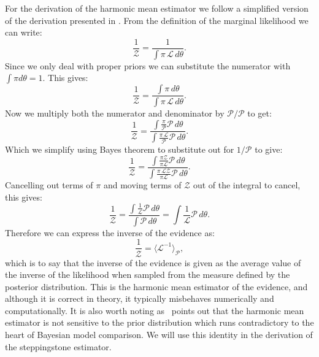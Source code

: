 For the derivation of the harmonic mean estimator we follow a simplified version of the derivation presented in \citep{newton1994approximate}. From the definition of the marginal likelihood we can write:
\begin{equation}
    \frac{1}{\mathcal{Z}} = \frac{1}{\int \pi \, \mathcal{L} \, d\theta}.
\end{equation}
Since we only deal with proper priors we can substitute the numerator with $\int \pi d\theta = 1$. This gives:
\begin{equation}
    \frac{1}{\mathcal{Z}} = \frac{\int \pi \, d\theta}{\int \pi \, \mathcal{L} \, d\theta}.
\end{equation}
Now we multiply both the numerator and denominator by $\mathcal{P}/\mathcal{P}$ to get:
\begin{equation}
    \frac{1}{\mathcal{Z}} = \frac{\int \frac{\pi}{\mathcal{P}} \mathcal{P} \, d\theta}{\int \frac{\pi \, \mathcal{L}}{\mathcal{P}}\mathcal{P} \, d\theta}.
\end{equation}
Which we simplify using Bayes theorem to substitute out for $1/\mathcal{P}$ to give:
\begin{equation}
    \frac{1}{\mathcal{Z}} = \frac{\int \frac{\pi \mathcal{Z}}{\pi \mathcal{L}} \mathcal{P} \, d\theta}{\int \frac{\pi \, \mathcal{L} \mathcal{Z}}{\pi \mathcal{L}}\mathcal{P} \, d\theta}.
\end{equation}
Cancelling out terms of $\pi$ and moving terms of $\mathcal{Z}$ out of the integral to cancel, this gives:
\begin{equation}\label{eqn:HME}
    \frac{1}{\mathcal{Z}} = \frac{\int \frac{1}{\mathcal{L}} \mathcal{P} \, d\theta}{\int \mathcal{P} \, d\theta} = \int \frac{1}{\mathcal{L}} \mathcal{P} \, d\theta.
\end{equation}
Therefore we can express the inverse of the evidence as:
\begin{equation}
    \frac{1}{\mathcal{Z}} = \langle \mathcal{L}^{-1} \rangle_{\mathcal{P}},
\end{equation}
which is to say that the inverse of the evidence is given as the average value of the inverse of the likelihood when sampled from the measure defined by the posterior distribution. This is the harmonic mean estimator of the evidence, and although it is correct in theory, it typically misbehaves numerically and computationally. It is also worth noting as~\cite{xie2010improving} points out that the harmonic mean estimator is not sensitive to the prior distribution which runs contradictory to the heart of Bayesian model comparison. We will use this identity in the derivation of the steppingstone estimator.

